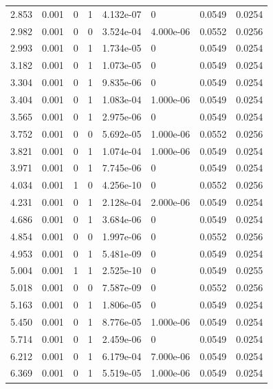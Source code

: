 \documentclass[preview]{standalone}
\begin{document}
{{\begin{tabular}{L{1.2cm}C{1.2cm} C{0.3cm}C{0.5cm} C{1.4cm}C{1.4cm} C{1.4cm}C{1.4cm}}
  2.853  &  0.001  & 0     &  1 &  4.132e-07  & 0  & 0.0549 &  0.0254   \\ 
  2.982  &  0.001  & 0     &  0 &  3.524e-04  & 4.000e-06  & 0.0552 &  0.0256   \\ 
  2.993  &  0.001  & 0     &  1 &  1.734e-05  & 0  & 0.0549 &  0.0254   \\ 
  3.182  &  0.001  & 0     &  1 &  1.073e-05  & 0  & 0.0549 &  0.0254   \\ 
  3.304  &  0.001  & 0     &  1 &  9.835e-06  & 0  & 0.0549 &  0.0254   \\ 
  3.404  &  0.001  & 0     &  1 &  1.083e-04  & 1.000e-06  & 0.0549 &  0.0254   \\ 
  3.565  &  0.001  & 0     &  1 &  2.975e-06  & 0  & 0.0549 &  0.0254   \\ 
  3.752  &  0.001  & 0     &  0 &  5.692e-05  & 1.000e-06  & 0.0552 &  0.0256   \\ 
  3.821  &  0.001  & 0     &  1 &  1.074e-04  & 1.000e-06  & 0.0549 &  0.0254   \\ 
  3.971  &  0.001  & 0     &  1 &  7.745e-06  & 0  & 0.0549 &  0.0254   \\ 
  4.034  &  0.001  & 1     &  0 &  4.256e-10  & 0  & 0.0552 &  0.0256   \\ 
  4.231  &  0.001  & 0     &  1 &  2.128e-04  & 2.000e-06  & 0.0549 &  0.0254   \\ 
  4.686  &  0.001  & 0     &  1 &  3.684e-06  & 0  & 0.0549 &  0.0254   \\ 
  4.854  &  0.001  & 0     &  0 &  1.997e-06  & 0  & 0.0552 &  0.0256   \\ 
  4.953  &  0.001  & 0     &  1 &  5.481e-09  & 0  & 0.0549 &  0.0254   \\ 
  5.004  &  0.001  & 1     &  1 &  2.525e-10  & 0  & 0.0549 &  0.0255   \\ 
  5.018  &  0.001  & 0     &  0 &  7.587e-09  & 0  & 0.0552 &  0.0256   \\ 
  5.163  &  0.001  & 0     &  1 &  1.806e-05  & 0  & 0.0549 &  0.0254   \\ 
  5.450  &  0.001  & 0     &  1 &  8.776e-05  & 1.000e-06  & 0.0549 &  0.0254   \\ 
  5.714  &  0.001  & 0     &  1 &  2.459e-06  & 0  & 0.0549 &  0.0254   \\ 
  6.212  &  0.001  & 0     &  1 &  6.179e-04  & 7.000e-06  & 0.0549 &  0.0254   \\ 
  6.369  &  0.001  & 0     &  1 &  5.519e-05  & 1.000e-06  & 0.0549 &  0.0254   \\ 

\end{tabular}}}
\end{document}
